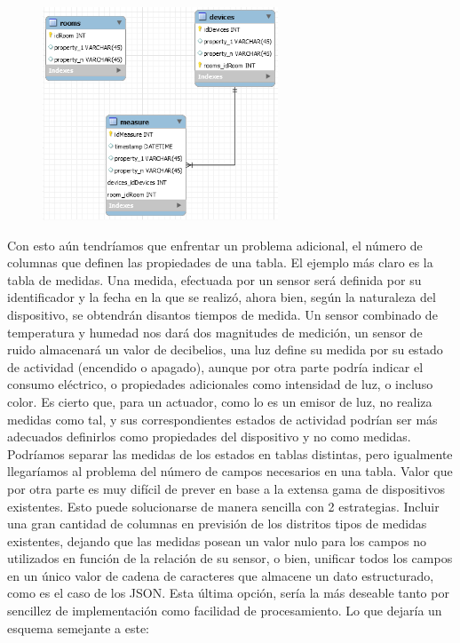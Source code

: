 \begin{figure}[hbt!]
\centering
\includegraphics[height=2.5in]{figures/SQLSchemaExample_2.png}
\end{figure}

\vspace{1.5cm}

Con esto aún tendríamos que enfrentar un problema adicional, el número de columnas que definen las propiedades de una tabla. El ejemplo más claro es la tabla de medidas. Una medida, efectuada por un sensor será definida por su identificador y la fecha en la que se realizó, ahora bien, según la naturaleza del dispositivo, se obtendrán disantos tiempos de medida. Un sensor combinado de temperatura y humedad nos dará dos magnitudes de medición, un sensor de ruido almacenará un valor de decibelios, una luz define su medida por su estado de actividad (encendido o apagado), aunque por otra parte podría indicar el consumo eléctrico, o propiedades adicionales como intensidad de luz, o incluso color. Es cierto que, para un actuador, como lo es un emisor de luz, no realiza medidas como tal, y sus correspondientes estados de actividad podrían ser más adecuados definirlos como propiedades del dispositivo y no como medidas. Podríamos separar las medidas de los estados en tablas distintas, pero igualmente llegaríamos al problema del número de campos necesarios en una tabla. Valor que por otra parte es muy difícil de prever en base a la extensa gama de dispositivos existentes. Esto puede solucionarse de manera sencilla con 2 estrategias. Incluir una gran cantidad de columnas en previsión de los distritos tipos de medidas existentes, dejando que las medidas posean un valor nulo para los campos no utilizados en función de la relación de su sensor, o bien, unificar todos los campos en un único valor de cadena de caracteres que almacene un dato estructurado, como es el caso de los JSON. Esta última opción, sería la más deseable tanto por sencillez de implementación como facilidad de procesamiento. Lo que dejaría un esquema semejante a este:

